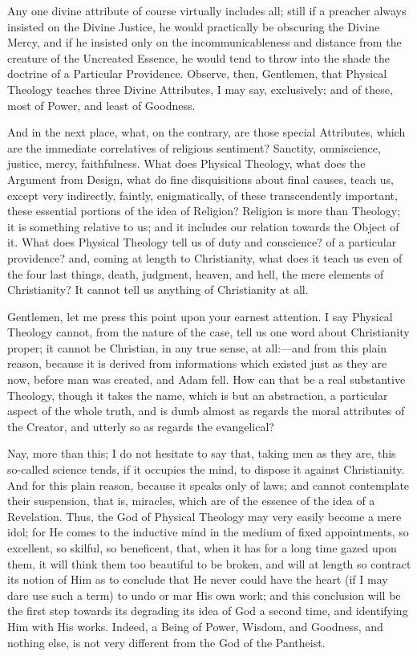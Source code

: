 Any one divine attribute of course virtually includes all; still if
a preacher always insisted on the Divine Justice, he would practically
be obscuring the Divine Mercy, and if he insisted only on the
incommunicableness and distance from the creature of the Uncreated
Essence, he would tend to throw into the shade the doctrine of a
Particular Providence. Observe, then, Gentlemen, that Physical
Theology teaches three Divine Attributes, I may say, exclusively; and
of these, most of Power, and least of Goodness.

And in the next place, what, on the contrary, are those special
Attributes, which are the immediate correlatives of religious
sentiment? Sanctity, omniscience, justice, mercy, faithfulness. What
does Physical Theology, what does the Argument from Design, what do
fine disquisitions about final causes, teach us, except very
indirectly, faintly, enigmatically, of these transcendently important,
these essential portions of the idea of Religion? Religion is more
than Theology; it is something relative to us; and it includes our
relation towards the Object of it. What does Physical Theology tell us
of duty and conscience? of a particular providence? and, coming at
length to Christianity, what does it teach us even of the four last
things, death, judgment, heaven, and hell, the mere elements of
Christianity? It cannot tell us anything of Christianity at all.

Gentlemen, let me press this point upon your earnest attention. I
say Physical Theology cannot, from the nature of the case, tell us one
word about Christianity proper; it cannot be Christian, in any true
sense, at all:—and from this plain reason, because it is derived
from informations which existed just as they are now, before man was
created, and Adam fell. How can that be a real substantive Theology,
though it takes the name, which is but an abstraction, a particular
aspect of the whole truth, and is dumb almost as regards the moral
attributes of the Creator, and utterly so as regards the evangelical?

Nay, more than this; I do not hesitate to say that, taking men as
they are, this so-called science tends, if it occupies the mind, to
dispose it against Christianity. And for this plain reason, because it
speaks only of laws; and cannot contemplate their suspension, that is,
miracles, which are of the essence of the idea of a Revelation. Thus,
the God of Physical Theology may very easily become a mere idol; for
He comes to the inductive mind in the medium of fixed appointments, so
excellent, so skilful, so beneficent, that, when it has for a long
time gazed upon them, it will think them too beautiful to be broken,
and will at length so contract its notion of Him as to conclude that
He never could have the heart (if I may dare use such a term) to undo
or mar His own work; and this conclusion will be the first step
towards its degrading its idea of God a second time, and identifying
Him with His works. Indeed, a Being of Power, Wisdom, and Goodness,
and nothing else, is not very different from the God of the Pantheist.

